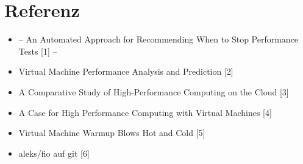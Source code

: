 \documentclass{article}
\begin{document}
\section{Referenz}
\begin{itemize}
    \item -- An Automated Approach for Recommending When to Stop Performance Tests [1] --
    \item Virtual Machine Performance Analysis and Prediction [2]
    \item A Comparative Study of High-Performance Computing on the Cloud [3]
    \item A Case for High Performance Computing with Virtual Machines [4]
    \item Virtual Machine Warmup Blows Hot and Cold [5]
    \item aleks/fio auf git [6]
\end{itemize}
\end{document}
